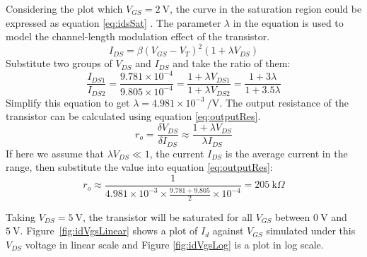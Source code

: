 \documentclass[12pt]{article}   %
\begin{document}
	Considering the plot which $V_{GS} = \SI{2}{\volt}$, the curve in the saturation region could be expressed as equation \eqref{eq:idsSat} \cite{mitraAnalogueElectronicsProject2024}. The parameter $\lambda$ in the equation is used to model the channel-length modulation effect of the transistor.
	\begin{equation}
		I_{DS} = \beta \left(V_{GS} - V_{T}\right)^2 \left(1 + \lambda V_{DS}\right)
		\label{eq:idsSat}
	\end{equation}
	Substitute two groups of $V_{DS}$ and $I_{DS}$ and take the ratio of them:
	\begin{equation}
		\frac{I_{DS1}}{I_{DS2}} = \frac{9.781 \times 10^{-4}}{9.805 \times 10^{-4}} = \frac{1 + \lambda V_{DS1}}{1 + \lambda V_{DS2}} = \frac{1 + 3\lambda}{1 + 3.5\lambda}
	\end{equation}
	Simplify this equation to get $\lambda = 4.981 \times 10^{-3}\ \si{\per\volt}$. The output resistance of the transistor can be calculated using equation \eqref{eq:outputRes}\cite{mitraAnalogueElectronicsProject2024}. 
	\begin{equation}
		r_o = \frac{\delta V_{DS}}{\delta I_{DS}} \approx \frac{1 + \lambda V_{DS}}{\lambda I_{DS}}
		\label{eq:outputRes}
	\end{equation}
	If here we assume that $\lambda V_{DS} \ll 1$, the current $I_{DS}$ is the average current in the range, then substitute the value into equation \eqref{eq:outputRes}:
	\begin{equation}
		r_o \approx \frac{1}{4.981 \times 10^{-3} \times \frac{9.781 + 9.805}{2} \times 10^{-4}} = \SI{205}{\kilo\Omega}
		\label{eq:outputResistance}
	\end{equation}
	
	Taking $V_{DS} = \SI{5}{\volt}$, the transistor will be saturated for all $V_{GS}$ between $\SI{0}{\volt}$ and $\SI{5}{\volt}$. Figure~\ref{fig:idVgsLinear} shows a plot of $I_{d}$ against $V_{GS}$ simulated under this $V_{DS}$ voltage in linear scale and Figure \ref{fig:idVgsLog} is a plot in log scale.
	
\end{document}
